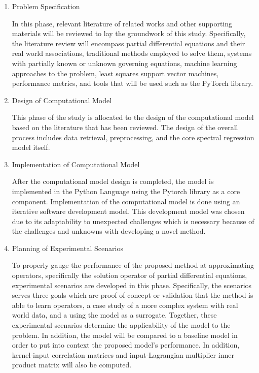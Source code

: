 \begin{enumerate}
      \item Problem Specification

            In this phase, relevant literature of related works and other supporting materials will be reviewed to lay the groundwork of this study. Specifically, the literature review will encompass partial differential equations and their real world associations, traditional methods employed to solve them, systems with partially known or unknown governing equations, machine learning approaches to the problem, least squares support vector machines, performance metrics, and tools that will be used such as the PyTorch library.

      \item Design of Computational Model

            This phase of the study is allocated to the design of the computational model based on the literature that has been reviewed. The design of the overall process includes data retrieval, preprocessing, and the core spectral regression model itself.

      \item Implementation of Computational Model

            After the computational model design is completed, the model is implemented in the Python Language using the Pytorch library as a core component. Implementation of the computational model is done using an iterative software development model. This development model was chosen due to its adaptability to unexpected challenges which is necessary because of the challenges and unknowns with developing a novel method.

      \item Planning of Experimental Scenarios

            To properly gauge the performance of the proposed method at approximating operators, specifically the solution operator of partial differential equations, experimental scenarios are developed in this phase. Specifically, the scenarios serves three goals which are proof of concept or validation that the method is able to learn operators, a case study of a more complex system with real world data, and a using the model as a surrogate. Together, these experimental scenarios determine the applicability of the model to the problem. In addition, the model will be compared to a baseline model in order to put into context the proposed model's performance. In addition, kernel-input correlation matrices and input-Lagrangian multiplier inner product matrix will also be computed.


\end{enumerate}
